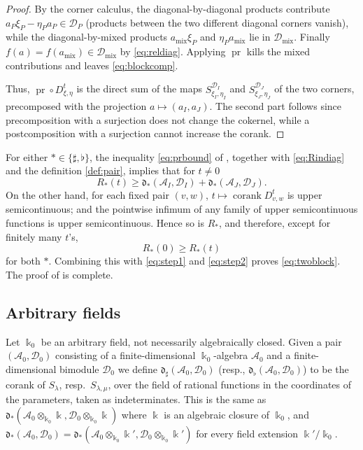 \documentclass[12pt]{article}
\def\xspace{ }%
\theoremstyle{definition}
\newcommand{\prigity}{pseudorigidity\xspace}
\newcommand{\mix}{\mathrm{mix}}   %
\newcommand{\pr}{\operatorname{pr}}
\newcommand{\kk}{\Bbbk}
\newcommand{\alg}{\mathcal{A}}   %
\newcommand{\bmdl}{\mathcal{D}}   %
\newcommand{\dfr}{\mathfrak{d}}  %
\newcommand{\Sop}{S}
\newcommand{\Dop}{D}
\newcommand{\rsub}{\sharp}       %
\newcommand{\psub}{\flat}        %
\newcommand{\cork}{\operatorname{corank}}
\begin{document}
\begin{proof}
By the corner calculus, the diagonal-by-diagonal products contribute
$a_P\xi_P - \eta_Pa_P \in \bmdl_P$ (products between the two different diagonal
corners vanish), while the diagonal-by-mixed products
$a_{\mix}\xi_P$ and $\eta_Pa_{\mix}$ lie in
$\bmdl_{\mix}$. Finally $f(a) = f(a_{\mix}) \in
\bmdl_{\mix}$ by \eqref{eq:reldiag}. Applying $\pr$ kills the
mixed contributions and leaves \eqref{eq:blockcomp}.

Thus, $\pr\circ \Dop^t_{\xi,\eta}$ is the direct sum of the maps
$\Sop^{\bmdl_I}_{\xi_I,\eta_I}$ and $\Sop^{\bmdl_J}_{\xi_J,\eta_J}$ of the two corners, precomposed with
the projection $a \mapsto (a_I,a_J)$. The second part follows since precomposition with a surjection
does not change the cokernel, while a postcomposition with a surjection cannot increase the corank.
\end{proof}

For either $\ast \in\{\rsub,\psub\}$,
the inequality \eqref{eq:prbound} of , together with \eqref{eq:Rindiag} and the definition \eqref{def:pair}, implies that for $t\ne0$
\begin{equation}\label{eq:step2}
   R_\ast(t) \ge \dfr_\ast(\alg_I,\bmdl_I) + \dfr_\ast(\alg_J,\bmdl_J) .
\end{equation}
On the other hand, for each fixed pair $(v,w)$, $t \mapsto \cork \Dop^t_{v,w}$ is upper
semicontinuous; and the pointwise infimum of any family of upper
semicontinuous functions is upper semicontinuous. Hence so is $R_\ast$, and
therefore, except for finitely many $t$'s,
\[
   R_\ast(0) \ge R_\ast(t)
\]
for both $\ast$.
Combining this with \eqref{eq:step1} and \eqref{eq:step2} proves \eqref{eq:twoblock}.
The proof of  is complete.

\subsection{Arbitrary fields}\label{ssec:arbhered}

Let $\kk_0$ be an arbitrary field, not necessarily algebraically closed.
Given a pair $(\alg_0,\bmdl_0)$ consisting of a finite-dimensional $\kk_0$-algebra $\alg_0$ and a finite-dimensional bimodule $\bmdl_0$ 
we define $\dfr_\rsub(\alg_0,\bmdl_0)$ (resp., $\dfr_\psub(\alg_0,\bmdl_0)$) to be the corank of $\Sop_\lambda$, resp.\
$\Sop_{\lambda,\mu}$, over the field of rational functions in the coordinates
of the parameters, taken as indeterminates.
This is the same as $\dfr_\ast(\alg_0\otimes_{\kk_0}\kk,\bmdl_0\otimes_{\kk_0}\kk)$
where $\kk$ is an algebraic closure  of $\kk_0$,
and $\dfr_\ast(\alg_0,\bmdl_0) =\dfr_\ast(\alg_0\otimes_{\kk_0}\kk',\bmdl_0\otimes_{\kk_0}\kk')$ for every
field extension $\kk'/\kk_0$.
\end{document}
